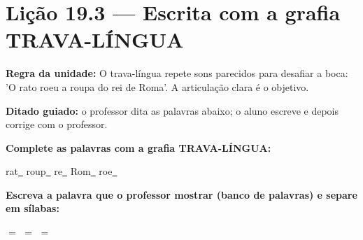 \section{Lição 19.3 --- Escrita com a grafia TRAVA-LÍNGUA}

\noindent\textbf{Regra da unidade:} O trava-língua repete sons parecidos para desafiar a boca: 'O rato roeu a roupa do rei de Roma'. A articulação clara é o objetivo.


\noindent\textbf{Ditado guiado:} o professor dita as palavras abaixo; o aluno escreve e depois corrige com o professor.

\begin{center}
  \underline{\hspace{2.3cm}} \quad \underline{\hspace{2.3cm}} \quad \underline{\hspace{2.3cm}} \quad \underline{\hspace{2.3cm}}

  \underline{\hspace{2.3cm}} \quad \underline{\hspace{2.3cm}} \quad \underline{\hspace{2.3cm}} \quad \underline{\hspace{2.3cm}}
\end{center}

\noindent\textbf{Complete as palavras com a grafia TRAVA-LÍNGUA:}
\begin{center}
  rat\underline{~} \quad roup\underline{~} \quad re\underline{~} \quad Rom\underline{~} \quad roe\underline{~}
\end{center}

\noindent\textbf{Escreva a palavra que o professor mostrar (banco de palavras) e separe em sílabas:}

\begin{center}
  \underline{\hspace{2cm}} $=$ \underline{\hspace{2cm}} \quad \underline{\hspace{2cm}} $=$ \underline{\hspace{2cm}} \quad \underline{\hspace{2cm}} $=$ \underline{\hspace{2cm}}
  \end{center}



